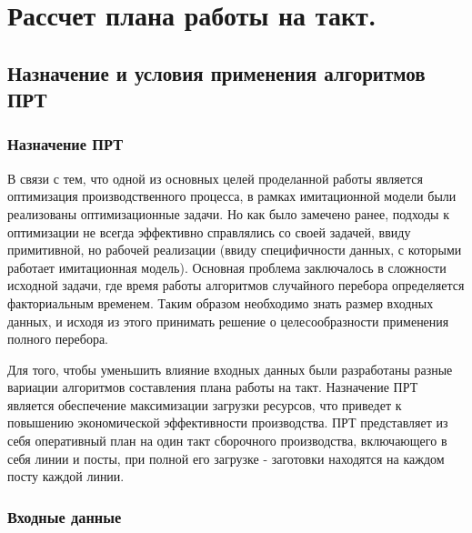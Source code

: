 \chapter{Рассчет плана работы на такт.}


\section{Назначение и условия применения алгоритмов ПРТ}
\subsection{Назначение ПРТ}
В связи с тем, что одной из основных целей проделанной работы является оптимизация производственного процесса, в рамках имитационной модели были реализованы оптимизационные задачи. Но как было замечено ранее, подходы к оптимизации не всегда эффективно справлялись со своей задачей, ввиду примитивной, но рабочей реализации (ввиду специфичности данных, с которыми работает имитационная модель). Основная проблема заключалось в сложности исходной задачи, где время работы алгоритмов случайного перебора определяется факториальным временем. Таким образом необходимо знать размер входных данных, и исходя из этого принимать решение о целесообразности применения полного перебора.

Для того, чтобы уменьшить влияние входных данных были разработаны разные вариации алгоритмов составления плана работы на такт. Назначение ПРТ является обеспечение максимизации загрузки ресурсов, что приведет к повышению экономической эффективности производства. ПРТ представляет из себя оперативный план на один такт сборочного производства, включающего в себя линии и посты, при полной его загрузке - заготовки находятся на каждом посту каждой линии.

\subsection{Входные данные}

